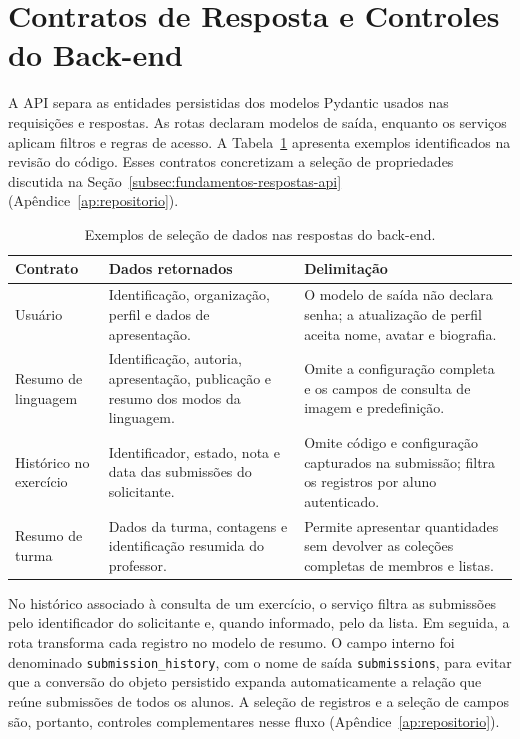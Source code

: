 \section{Contratos de Resposta e Controles do Back-end}
\label{sec:contratos-seguranca-backend}

A API separa as entidades persistidas dos modelos Pydantic usados nas requisições e respostas. As rotas declaram modelos de saída, enquanto os serviços aplicam filtros e regras de acesso. A Tabela~\ref{tab:contratos-backend} apresenta exemplos identificados na revisão do código. Esses contratos concretizam a seleção de propriedades discutida na Seção~\ref{subsec:fundamentos-respostas-api} \cite{fastapi2026response} (Apêndice~\ref{ap:repositorio}).

\begin{table}[htbp]
\centering
\caption{Exemplos de seleção de dados nas respostas do back-end.}
\label{tab:contratos-backend}
\small
\renewcommand{\arraystretch}{1.15}
\begin{tabular}{|>{\raggedright\arraybackslash}p{}|>{\raggedright\arraybackslash}p{}|>{\raggedright\arraybackslash}p{}|}
\hline
\textbf{Contrato} & \textbf{Dados retornados} & \textbf{Delimitação} \\\hline
Usuário & Identificação, organização, perfil e dados de apresentação. & O modelo de saída não declara senha; a atualização de perfil aceita nome, avatar e biografia. \\\hline
Resumo de linguagem & Identificação, autoria, apresentação, publicação e resumo dos modos da linguagem. & Omite a configuração completa e os campos de consulta de imagem e predefinição. \\\hline
Histórico no exercício & Identificador, estado, nota e data das submissões do solicitante. & Omite código e configuração capturados na submissão; filtra os registros por aluno autenticado. \\\hline
Resumo de turma & Dados da turma, contagens e identificação resumida do professor. & Permite apresentar quantidades sem devolver as coleções completas de membros e listas. \\\hline
\end{tabular}
\end{table}
\FloatBarrier

No histórico associado à consulta de um exercício, o serviço filtra as submissões pelo identificador do solicitante e, quando informado, pelo da lista. Em seguida, a rota transforma cada registro no modelo de resumo. O campo interno foi denominado \texttt{submission\_history}, com o nome de saída \texttt{submissions}, para evitar que a conversão do objeto persistido expanda automaticamente a relação que reúne submissões de todos os alunos. A seleção de registros e a seleção de campos são, portanto, controles complementares nesse fluxo (Apêndice~\ref{ap:repositorio}).

